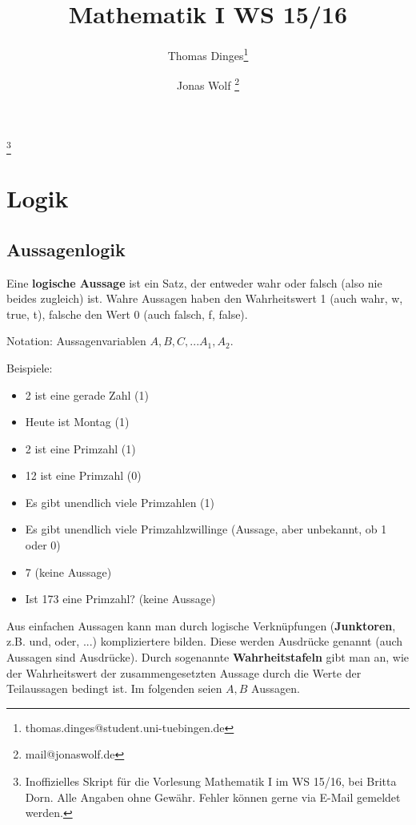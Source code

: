 \documentclass[a4paper, 12pt, twoside] {article}
\title{Mathematik I WS 15/16}
\author{Thomas Dinges\thanks{thomas.dinges@student.uni-tuebingen.de} \and Jonas Wolf \thanks{mail@jonaswolf.de}}
\begin{document}
\maketitle

\vfill
\thanks{Inoffizielles Skript für die Vorlesung Mathematik I im WS 15/16, bei Britta Dorn. Alle Angaben ohne Gewähr. Fehler können gerne via E-Mail gemeldet werden.}

\newpage

\tableofcontents

\newpage


\section{Logik} %


\subsection*{Aussagenlogik}
Eine \textbf{logische Aussage} ist ein Satz, der entweder wahr oder falsch (also nie beides zugleich) ist. 
Wahre Aussagen haben den Wahrheitswert 1 (auch wahr, w, true, t), falsche den Wert 0 (auch falsch, f, false).

Notation: Aussagenvariablen $A, B, C, ... A_1, A_2$.

Beispiele:
\begin{itemize}
\item 2 ist eine gerade Zahl (1)
\item Heute ist Montag (1)
\item 2 ist eine Primzahl (1)
\item 12 ist eine Primzahl (0)
\item Es gibt unendlich viele Primzahlen (1)
\item Es gibt unendlich viele Primzahlzwillinge (Aussage, aber unbekannt, ob 1 oder 0)
\item 7 (keine Aussage)
\item Ist 173 eine Primzahl? (keine Aussage)
\end{itemize}


Aus einfachen Aussagen kann man durch logische Verknüpfungen (\textbf{Junktoren}, z.B. und, oder, ...) kompliziertere bilden. Diese werden Ausdrücke genannt (auch Aussagen sind Ausdrücke). 
Durch sogenannte \textbf{Wahrheitstafeln} gibt man an, wie der Wahrheitswert der zusammengesetzten Aussage durch die Werte der Teilaussagen bedingt ist. Im folgenden seien $A, B$ Aussagen. 
\end{document}
